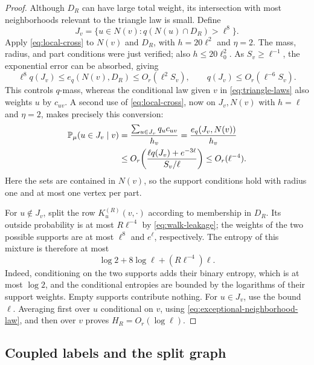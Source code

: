 \begin{proof}
Although $D_R$ can have large total weight, its intersection with most
neighborhoods relevant to the triangle law is small.  Define
\[
 J_v=\{u\in N(v):q(N(u)\cap D_R)>\ell^8\}.
\]
Apply \eqref{eq:local-cross} to $N(v)$ and $D_R$, with $h=20\ell^2$
and $\eta=2$.  The mass, radius, and part conditions were just verified;
also $h\le20\ell_0^2$.  As $S_v\ge\ell^{-1}$, the exponential error
can be absorbed, giving
\[
 \ell^8q(J_v)\le e_q(N(v),D_R)\le O_r(\ell^2S_v),
 \qquad q(J_v)\le O_r(\ell^{-6}S_v).
\]
This controls $q$-mass, whereas the conditional law given $v$ in
\eqref{eq:triangle-laws} also weights $u$ by $c_{uv}$.  A second use of
\eqref{eq:local-cross}, now on $J_v,N(v)$ with $h=\ell$ and $\eta=2$,
makes precisely this conversion:
\begin{equation}
 \begin{aligned}
 \mathbb P_\mu(u\in J_v\mid v)
 &=\frac{\sum_{u\in J_v}q_uc_{uv}}{h_v}
   =\frac{e_q(J_v,N(v))}{h_v}\\
 &\le O_r\!\left(
       \frac{\ell q(J_v)+e^{-3\ell}}{S_v/\ell}\right)
   \le O_r(\ell^{-4}).
 \end{aligned}
 \label{eq:exceptional-neighborhood-law}
\end{equation}
Here the sets are contained in $N(v)$, so the support conditions hold
with radius one and at most one vertex per part.

For $u\notin J_v$, split the row $K_u^{(R)}(v,\cdot)$ according to
membership in $D_R$.  Its outside probability is at most $R\ell^{-4}$
by \eqref{eq:walk-leakage}; the weights of the two possible supports
are at most $\ell^8$ and $e^\ell$, respectively.  The entropy of this
mixture is therefore at most
\[
 \log2+8\log\ell+(R\ell^{-4})\ell.
\]
Indeed, conditioning on the two supports adds their binary entropy,
which is at most $\log2$, and the conditional entropies are bounded by
the logarithms of their support weights.  Empty supports contribute
nothing.  For $u\in J_v$, use the bound $\ell$.  Averaging first over
$u$ conditional on $v$, using
\eqref{eq:exceptional-neighborhood-law}, and then over $v$ proves
$H_R=O_r(\log\ell)$.
\end{proof}

\subsection{Coupled labels and the split graph}
\label{subsec:coupled-splitting}

